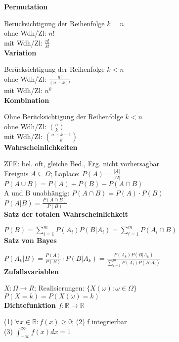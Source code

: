 \documentclass[10pt,twocolumn,a4paper]{article}
\begin{document}
\begin{flushleft}

\textbf{Permutation}

Berücksichtigung der Reihenfolge $k=n$\\
ohne Wdh/Zl: $n!$\\
mit Wdh/Zl: $\frac{n!}{k!}$\\

\textbf{Variation}

Berücksichtigung der Reihenfolge $k < n$\\
ohne Wdh/Zl: $\frac{n!}{(n-k)!}$\\
mit Wdh/Zl: $n^k$\\

\textbf{Kombination}

Ohne Berücksichtigung der Reihenfolge $k < n$\\
ohne Wdh/Zl: $\binom{n}{k}$\\
mit Wdh/Zl: $\binom{n+k-1}{k}$\\

\textbf{Wahrscheinlichkeiten}

ZFE: bel. oft, gleiche Bed., Erg. nicht vorhersagbar\\
Ereignis $A \subseteq \Omega$; Laplace: $P(A) = \frac{|A|}{|\Omega|}$\\

$P(A \cup B) = P(A) + P(B) - P(A \cap B)$\\
A und B unabhängig: $P(A \cap B) = P(A) \cdot P(B)$\\
$P(A|B) = \frac{P(A \cap B)}{P(B)}$\\

\textbf{Satz der totalen Wahrscheinlichkeit}

$P(B) = \sum_{i=1}^m P(A_i) P(B|A_i) = \sum_{i=1}^m P(A_i \cap B)$\\

\textbf{Satz von Bayes}

$P(A_k|B) = \frac{P(A)}{P(B)} \cdot P(B|A_k) = \frac{P(A_k) P(B|A_k)}{\sum_{i=1}^m P(A_i) P(B|A_i)}$\\

\textbf{Zufallsvariablen}

$X: \Omega \rightarrow R$; Realisierungen: $\{ X(\omega) : \omega \in \Omega\}$\\
$P(X=k) = P(X(\omega)=k)$\\

\textbf{Dichtefunktion $f: \mathbb{R} \rightarrow \mathbb{R}$}

(1) $\forall x \in \mathbb{R}: f(x) \geq 0$; (2) f integrierbar\\
(3) $\int_{-\infty}^{\infty}f(x)dx = 1$\\


\end{flushleft}
\end{document}
